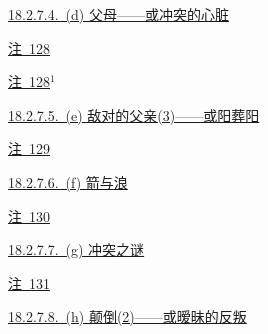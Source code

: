 \par\noindent\hspace*{2.70em}\hyperref[ch18:local:h38]{18.2.7.4.~(d) 父母——或冲突的心脏}\nobreak\dotfill\nobreak\hyperref[ch18:local:h38]{\pageref*{ch18:local:h38}}\par
\par\noindent\hspace*{4.05em}\hyperref[ch18:local:n33]{注~128}\nobreak\dotfill\nobreak\hyperref[ch18:local:n33]{\pageref*{ch18:local:n33}}\par
\par\noindent\hspace*{4.05em}\hyperref[ch18:local:n34]{注~128$^1$}\nobreak\dotfill\nobreak\hyperref[ch18:local:n34]{\pageref*{ch18:local:n34}}\par
\par\noindent\hspace*{2.70em}\hyperref[ch18:local:h39]{18.2.7.5.~(e) 敌对的父亲(3)——或阳葬阳}\nobreak\dotfill\nobreak\hyperref[ch18:local:h39]{\pageref*{ch18:local:h39}}\par
\par\noindent\hspace*{4.05em}\hyperref[ch18:local:n35]{注~129}\nobreak\dotfill\nobreak\hyperref[ch18:local:n35]{\pageref*{ch18:local:n35}}\par
\par\noindent\hspace*{2.70em}\hyperref[ch18:local:h40]{18.2.7.6.~(f) 箭与浪}\nobreak\dotfill\nobreak\hyperref[ch18:local:h40]{\pageref*{ch18:local:h40}}\par
\par\noindent\hspace*{4.05em}\hyperref[ch18:local:n36]{注~130}\nobreak\dotfill\nobreak\hyperref[ch18:local:n36]{\pageref*{ch18:local:n36}}\par
\par\noindent\hspace*{2.70em}\hyperref[ch18:local:h41]{18.2.7.7.~(g) 冲突之谜}\nobreak\dotfill\nobreak\hyperref[ch18:local:h41]{\pageref*{ch18:local:h41}}\par
\par\noindent\hspace*{4.05em}\hyperref[ch18:local:n37]{注~131}\nobreak\dotfill\nobreak\hyperref[ch18:local:n37]{\pageref*{ch18:local:n37}}\par
\par\noindent\hspace*{2.70em}\hyperref[ch18:local:h42]{18.2.7.8.~(h) 颠倒(2)——或暧昧的反叛}\nobreak\dotfill\nobreak\hyperref[ch18:local:h42]{\pageref*{ch18:local:h42}}\par
